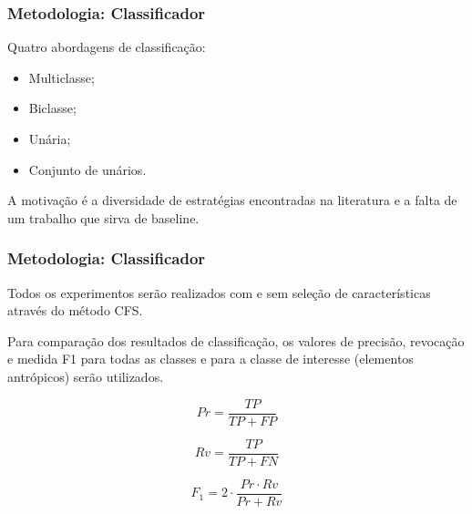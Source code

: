 \documentclass[t]{beamer}
\begin{document}
\begin{frame}[c]
	\frametitle{Metodologia: Classificador}
	
	Quatro abordagens de classificação:
	\begin{itemize}
		\item Multiclasse;
		\item Biclasse;
		\item Unária;
		\item Conjunto de unários.
	\end{itemize}

	\vspace{0.5cm}

	A motivação é a diversidade de estratégias encontradas na literatura e a falta de um trabalho que sirva de baseline.
\end{frame}

\begin{frame}[c]
	\frametitle{Metodologia: Classificador}

	Todos os experimentos serão realizados com e sem seleção de características através do método CFS.

	\vspace{0.5cm}

	Para comparação dos resultados de classificação, os valores de precisão, revocação e medida F1 para todas as classes e para a classe de interesse (elementos antrópicos) serão utilizados.

	\begin{equation*}
		\displaystyle Pr = \frac{TP}{TP+FP}
	\end{equation*}

	\begin{equation*}
		\displaystyle Rv = \frac{TP}{TP+FN}
	\end{equation*}

	\begin{equation*}
  		\displaystyle F_1 = 2 \cdot \frac{Pr \cdot Rv}{Pr + Rv}
	\end{equation*}
\end{frame}
\end{document}
